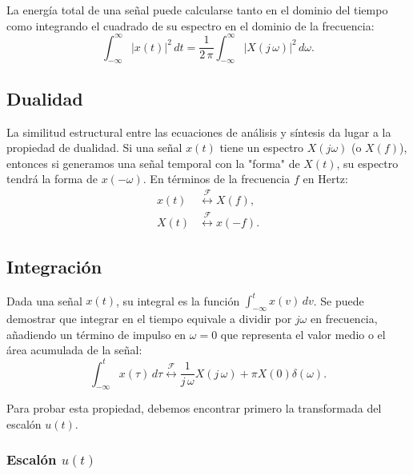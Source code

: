 La energía total de una señal puede calcularse tanto en el dominio del tiempo como integrando el cuadrado de su espectro en el dominio de la frecuencia:
\begin{equation}
	\int_{-\infty}^{\infty} |x(t)|^{2} \, dt = \frac{1}{2 \, \pi} \int_{-\infty}^{\infty} |X(j \, \omega)|^{2} \, d\omega .
\end{equation}

\subsection{Dualidad}

La similitud estructural entre las ecuaciones de análisis y síntesis da lugar a la propiedad de dualidad. Si una señal $x(t)$ tiene un espectro $X(j\omega)$ (o $X(f)$), entonces si generamos una señal temporal con la "forma" de $X(t)$, su espectro tendrá la forma de $x(-\omega)$. En términos de la frecuencia $f$ en Hertz:
\begin{align}
	x(t) &\stackrel{\mathcal{F}}{\longleftrightarrow} X(f), \\
	X(t) &\stackrel{\mathcal{F}}{\longleftrightarrow} x(-f).
\end{align}

\subsection{Integración}

Dada una señal $x(t)$, su integral es la función $\int_{-\infty}^{t} x(v) \, dv$. Se puede demostrar que integrar en el tiempo equivale a dividir por $j\omega$ en frecuencia, añadiendo un término de impulso en $\omega=0$ que representa el valor medio o el área acumulada de la señal:
\begin{equation}
	\int_{-\infty}^{t} x(\tau) \, d\tau \stackrel{\mathcal{F}}{\longleftrightarrow} \frac{1}{j \, \omega} X(j \, \omega) + \pi X(0) \delta(\omega).
\end{equation}

Para probar esta propiedad, debemos encontrar primero la transformada del escalón $u(t)$.

\subsubsection{Escalón $u(t)$}


